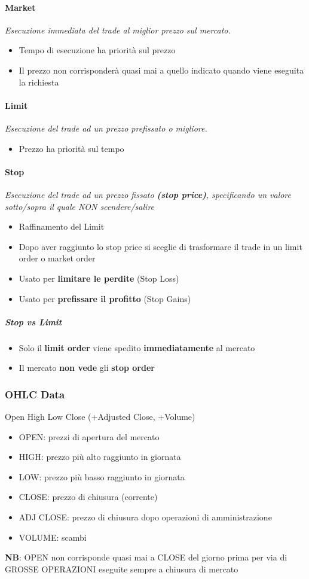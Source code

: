 \documentclass[12pt]{article}
\begin{document}
\paragraph{Market} \textit{Esecuzione immediata del trade al miglior prezzo sul mercato.}
\begin{itemize}
    \item Tempo di esecuzione ha priorità sul prezzo
    \item Il prezzo non corrisponderà quasi mai a quello indicato quando viene eseguita la richiesta
\end{itemize}
\paragraph{Limit} \textit{Esecuzione del trade ad un prezzo prefissato o migliore.}
\begin{itemize}
    \item Prezzo ha priorità sul tempo
\end{itemize}
\paragraph{Stop} \textit{Esecuzione del trade ad un prezzo fissato \textbf{(stop price)}, specificando un valore sotto/sopra il quale NON scendere/salire}
\begin{itemize}
    \item Raffinamento del Limit
    \item Dopo aver raggiunto lo stop price si sceglie di trasformare il trade in un limit order o market order
    \item Usato per \textbf{limitare le perdite} (Stop Loss)
    \item Usato per \textbf{prefissare il profitto} (Stop Gains)
\end{itemize}
\subparagraph{Stop vs Limit}
\begin{itemize}
    \item Solo il \textbf{limit order} viene spedito \textbf{immediatamente} al mercato
    \item Il mercato \textbf{non vede} gli \textbf{stop order}
\end{itemize}
\newpage
\subsubsection{OHLC Data}
Open High Low Close (+Adjusted Close, +Volume)
\begin{itemize}
    \item OPEN: prezzi di apertura del mercato
    \item HIGH: prezzo più alto raggiunto in giornata
    \item LOW: prezzo più basso raggiunto in giornata
    \item CLOSE: prezzo di chiusura (corrente)
    \item ADJ CLOSE: prezzo di chiusura dopo operazioni di amministrazione
    \item VOLUME: scambi
\end{itemize}
\textbf{NB}: OPEN non corrisponde quasi mai a CLOSE del giorno prima per via di GROSSE OPERAZIONI eseguite sempre a chiusura di mercato
\end{document}
